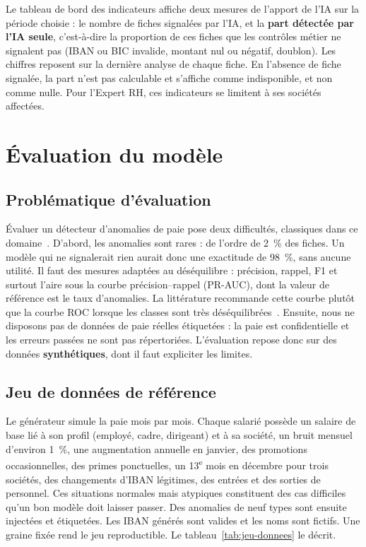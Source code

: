 Le tableau de bord des indicateurs affiche deux mesures de l'apport de l'IA sur la période choisie : le nombre de fiches signalées par l'IA, et la \textbf{part détectée par l'IA seule}, c'est-à-dire la proportion de ces fiches que les contrôles métier ne signalent pas (IBAN ou BIC invalide, montant nul ou négatif, doublon). Les chiffres reposent sur la dernière analyse de chaque fiche. En l'absence de fiche signalée, la part n'est pas calculable et s'affiche comme indisponible, et non comme nulle. Pour l'Expert RH, ces indicateurs se limitent à ses sociétés affectées.

\section{Évaluation du modèle}

\subsection{Problématique d'évaluation}

Évaluer un détecteur d'anomalies de paie pose deux difficultés, classiques dans ce domaine~\cite{chandola2009survey}. D'abord, les anomalies sont rares : de l'ordre de 2~\% des fiches. Un modèle qui ne signalerait rien aurait donc une exactitude de 98~\%, sans aucune utilité. Il faut des mesures adaptées au déséquilibre : précision, rappel, F1 et surtout l'aire sous la courbe précision--rappel (PR-AUC), dont la valeur de référence est le taux d'anomalies. La littérature recommande cette courbe plutôt que la courbe ROC lorsque les classes sont très déséquilibrées~\cite{saito2015pr}. Ensuite, nous ne disposons pas de données de paie réelles étiquetées : la paie est confidentielle et les erreurs passées ne sont pas répertoriées. L'évaluation repose donc sur des données \textbf{synthétiques}, dont il faut expliciter les limites.

\subsection{Jeu de données de référence}

Le générateur simule la paie mois par mois. Chaque salarié possède un salaire de base lié à son profil (employé, cadre, dirigeant) et à sa société, un bruit mensuel d'environ 1~\%, une augmentation annuelle en janvier, des promotions occasionnelles, des primes ponctuelles, un 13\textsuperscript{e} mois en décembre pour trois sociétés, des changements d'IBAN légitimes, des entrées et des sorties de personnel. Ces situations normales mais atypiques constituent des \og cas difficiles\fg{} qu'un bon modèle doit laisser passer. Des anomalies de neuf types sont ensuite injectées et étiquetées. Les IBAN générés sont valides et les noms sont fictifs. Une graine fixée rend le jeu reproductible. Le tableau~\ref{tab:jeu-donnees} le décrit.

